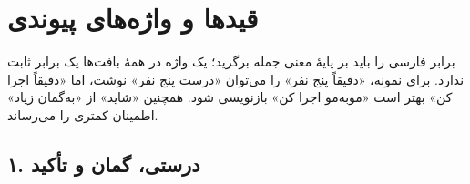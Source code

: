 \chapter{قیدها و واژه‌های پیوندی}
\noindent
برابر فارسی را باید بر پایهٔ معنی جمله برگزید؛ یک واژه در همهٔ بافت‌ها یک برابر ثابت ندارد.
برای نمونه، «دقیقاً پنج نفر» را می‌توان «درست پنج نفر» نوشت، اما «دقیقاً اجرا کن»
بهتر است «مو‌به‌مو اجرا کن» بازنویسی شود.
همچنین «شاید» از «به‌گمان زیاد» اطمینان کمتری را می‌رساند.

\section*{۱. درستی، گمان و تأکید}
\begingroup
\small
\setlength{\tabcolsep}{4pt}
\renewcommand{\arraystretch}{1.3}
